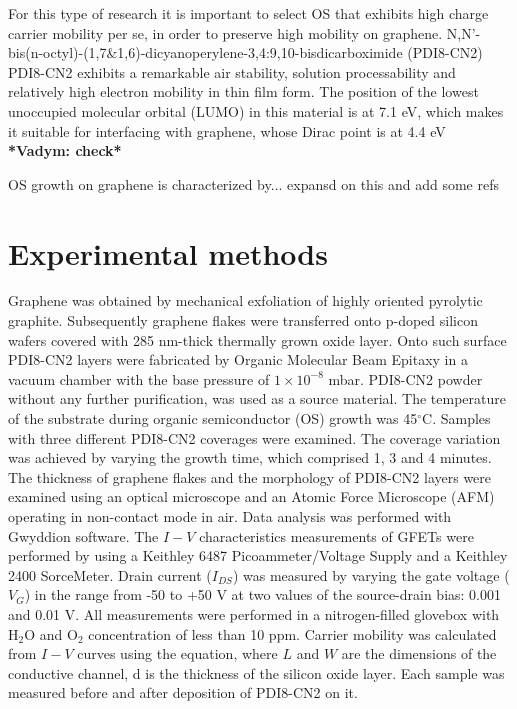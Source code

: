 \documentclass[preprint,aip,jap]{revtex4-2}
\begin{document}
For this type of research it is important to select OS that exhibits high charge carrier mobility per se, in order to preserve high mobility on graphene.   N,N'-bis(n-octyl)-(1,7\&1,6)-dicyanoperylene-3,4:9,10-bisdicarboximide (PDI8-CN2)
PDI8-CN2 exhibits a remarkable air stability, solution processability and relatively high electron mobility in thin film form\cite{jung-2014,molinari-2009,piliego-2009a}.  The position of the lowest unoccupied molecular orbital (LUMO) in this material is at 7.1 eV\cite{jung-2014}, which makes it suitable for interfacing with graphene, whose Dirac point is at 4.4 eV \textbf{*Vadym: check*}

OS growth on graphene is characterized by... expansd on this and add some refs


\section{\label{sec:exper}Experimental methods}


Graphene was obtained by mechanical exfoliation of highly oriented pyrolytic graphite. Subsequently graphene flakes were transferred onto p-doped silicon wafers covered with 285 nm-thick thermally grown oxide layer. Onto such surface PDI8-CN2 layers were fabricated by Organic Molecular Beam Epitaxy in a vacuum chamber with the base pressure of $1\times10^{-8}$ mbar. PDI8-CN2 powder without any further purification, was used as a source material. The temperature of the substrate during organic semiconductor (OS) growth was 45$^\circ$C. Samples with three different PDI8-CN2 coverages were examined. The coverage variation was achieved by varying the growth time, which comprised 1, 3 and 4 minutes. The thickness of graphene flakes and the morphology of PDI8-CN2 layers were examined using an optical microscope and an Atomic Force Microscope (AFM) operating in non-contact mode in air. Data analysis was performed with Gwyddion software\cite{necas-2012}. The $I-V$ characteristics measurements of GFETs were performed by using a Keithley 6487 Picoammeter/Voltage Supply and a Keithley 2400 SorceMeter. Drain current ($I_{DS}$) was measured by varying the gate voltage ($V_G$) in the range from -50 to +50 V at two values of the source-drain bias: 0.001 and 0.01 V. All measurements were performed in a nitrogen-filled glovebox with H$_2$O and O$_2$ concentration of less than 10 ppm.  Carrier mobility was calculated from $I-V$ curves using the equation, where $L$ and $W$ are the dimensions of the conductive channel, d is the thickness of the silicon oxide layer. Each sample was measured before and after deposition of PDI8-CN2 on it.
\end{document}
